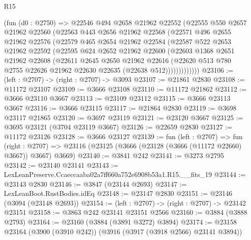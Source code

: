 \begin{lexlean}{R15}
\begin{coremodule}
        (fun (d0 : @2750) =>
        @22546
          @494
          @2658
          @21962
          @22552
          (@22555
            @550
            @2657
            @21962
            @22560
            (@22563
              @443
              @2656
              @21962
              @22568
              (@22571
                @496
                @2655
                @21962
                @22576
                (@22579
                  @465
                  @2654
                  @21962
                  @22584
                  (@22587
                    @522
                    @2653
                    @21962
                    @22592
                    (@22595
                      @624
                      @2652
                      @21962
                      @22600
                      (@22603
                        @1368
                        @2651
                        @21962
                        @22608
                        (@22611
                          @2645
                          @2650
                          @21962
                          @22616
                          (@22620
                            @513
                            @780
                            @2755
                            @22626
                            @21962
                            @22630
                            @22635
                            (@22638 @512)))))))))))))
@23106 := (left : @2707) -> (right : @2707) -> @3093
@23107 := @21861 @2830
@23108 := @11172 @23107
@23109 := @3666 @23108
@23110 := @11172 @21862
@23112 := @3666 @23110 @3667
@23113 := @23109 @23112
@23115 := @3666 @23113 @3667
@23116 := @3666 @23115
@23117 := @21864 @2830
@23119 := @3698 @23117 @21865
@23120 := @3697 @23119
@23121 := @23120 @3667
@23125 := @3695 @23121 (@3704 @23119 @3667)
@23126 := @22659 @2830
@23127 := @11172 @23126
@23128 := @3666 @23127
@23139 := fun (left : @2707) =>
  fun (right : @2707) => @23116 (@23125 (@3666 (@23128 (@3666 (@11172 @22660) @3667)) @3667) @3669)
@23140 := @3841 @242
@23141 := @3273 @2795
@23142 := @23140 @23141
@23143 := LexLeanPreserve.Ccaeccaaba02a7ff660a752e6908b53a1.R15.__fits_19
@23144 := @23143 @2830
@23146 := @3847 (@23144 @2693)
@23147 := LexLeanBoot.RustBodies.idEq
@23148 := @23147 @2830
@23151 := @23146 (@3094 (@23148 @2693))
@23154 := (left : @2707) -> (right : @2707) -> @23142 @23151
@23158 := @3863 @242 @23141 @23151 @2566
@23160 := @3884 (@3888 @2793)
@23164 := @23160 (@3884 (@3891 @3272) @3894)
@23174 := @23158 @23164 (@3900 (@3910 @242)) (@3916 (@3917 (@3918 @2566) @23141 @3894))

\end{coremodule}
\end{lexlean}
